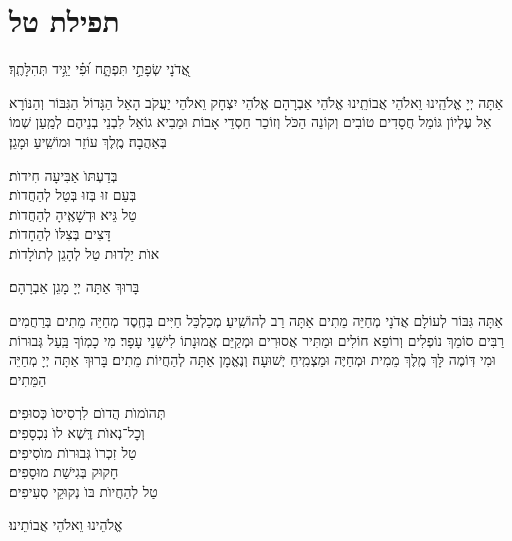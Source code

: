 \documentclass[twoside, openany, parskip=half, 11pt]{book}
\begin{document}
\sepline

\clearpage

\vspace{-1\baselineskip}

\section[תפילת טל]{ תפילת טל }
\label{tefilastal}


\begin{small}
אֲ֭דֹנָי שְׂפָתַ֣י תִּפְתָּ֑ח וּ֝פִ֗י יַגִּ֥יד תְּהִלָּתֶֽךָ׃
\\
\end{small}
אַתָּה יְיָ אֱלֹהֵֽינוּ וֵאלֹהֵי אֲבוֹתֵֽינוּ אֱלֹהֵי אַבְרָהָם אֱלֹהֵי יִצְחָק וֵאלֹהֵי יַעֲקֹב הָאֵל הַגָּדוֹל הַגִּבּוֹר וְהַנּוֹרָא אֵל עֶלְיוֹן גּוֹמֵל חֲסָדִים טוֹבִים וְקוֹנֵה הַכֹּל וְזוֹכֵר חַסְדֵי אָבוֹת וּמֵבִיא גוֹאֵל לִבְנֵי בְנֵיהֶם לְמַֽעַן שְׁמוֹ בְּאַהֲבָה׃ מֶֽלֶךְ עוֹזֵר וּמוֹשִֽׁיעַ וּמָגֵן׃


\begin{large}
בְּדַעְתּוׂ אַבִּיעָה חִידוׂת׃ \\
בְּעַם זוּ בְּזוּ בְּטַל לְהַחֲדוׂת׃\\
טַל גֵּיא וּדְשָׁאֶֽיהָ לְהַחֲדוׂת׃ \\
דָּצִים בְּצִלּוׂ לְהֵחָדוׂת׃\\
אוׂת יַלְדוּת טַל לְהָגֵן לְתוׂלָדוׂת׃

\end{large}


בָּרוּךְ אַתָּה יְיָ מָגֵן אַבְרָהָם׃

אַתָּה גִּבּוֹר לְעוֹלָם אֲדֹנָי מְחַיֵּה מֵתִים אַתָּה רַב לְהוֹשִֽׁיעַ׃ מְכַלְכֵּל חַיִּים בְּחֶֽסֶד מְחַיֵּה מֵתִים בְּרַחֲמִים רַבִּים סוֹמֵךְ נוֹפְלִים וְרוֹפֵא חוֹלִים וּמַתִּיר אֲסוּרִים וּמְקַיֵּם אֱמוּנָתוֹ לִישֵׁנֵי עָפָר׃ מִי כָמֽוֹךָ בַּֽעַל גְּבוּרוֹת וּמִי דּֽוֹמֶה לָּךְ מֶֽלֶךְ מֵמִית וּמְחַיֶּה וּמַצְמִֽיחַ יְשׁוּעָה׃ וְנֶאֱמָן אַתָּה לְהַחֲיוֹת מֵתִים׃ בָּרוּךְ אַתָּה יְיָ מְחַיֵּה הַמֵּתִים׃


תְּהוׂמוׂת הֲדוׂם לִרְסִיסוׂ כְּסוּפִים׃ \\
וְכׇל־נְאוׂת דֶּֽשֶׁא לוׂ נִכְסָפִים׃\\
טַל זִכְרוׂ גְּבוּרוׂת מוׂסִיפִים׃ \\
חָקוּק בְּגִישַׁת מוּסָפִים׃\\
טַל לְהַחֲיוׂת בּוׂ נְקוּקֵי סְעִיפִים׃


\begin{small}
אֱלֹהֵינוּ וֵאלֹהֵי אֲבוֹתֵינוּ׃
\end{small}
\end{document}
